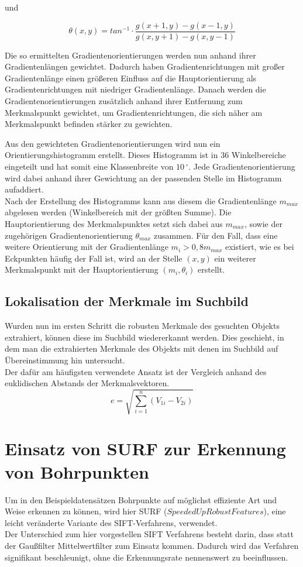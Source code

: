 und

\begin{equation*}
\theta (x, y) = tan^{-1}\cdot \frac{g(x +1, y) - g(x-1, y)}{g(x, y +1) - g(x, y-1)}
\end{equation*}

Die so ermittelten Gradientenorientierungen werden nun anhand ihrer Gradientenlängen gewichtet. Dadurch haben Gradientenrichtungen mit großer Gradientenlänge einen größeren Einfluss auf die Hauptorientierung als Gradientenrichtungen mit niedriger Gradientenlänge.
Danach werden die Gradientenorientierungen zusätzlich anhand ihrer Entfernung zum Merkmalspunkt gewichtet, um Gradientenrichtungen, die sich näher am Merkmalspunkt befinden stärker zu gewichten.

Aus den gewichteten Gradientenorientierungen wird nun ein Orientierungshistogramm erstellt. Dieses Histogramm ist in 36 Winkelbereiche eingeteilt und hat somit eine Klassenbreite von $10\,^{\circ}$.
Jede Gradientenorientierung wird dabei anhand ihrer Gewichtung an der passenden Stelle im Histogramm aufaddiert. \\
Nach der Erstellung des Histogramms kann aus diesem die Gradientenlänge $m_{max}$ abgelesen werden (Winkelbereich mit der größten Summe). Die Hauptorientierung des Merkmalspunktes  setzt sich dabei aus $m_{max}$, sowie der zugehörigen Gradientenorientierung $\theta_{max}$ zusammen.
Für den Fall, dass eine weitere Orientierung mit der Gradientenlänge $m_i > 0,8 m_{max}$
existiert, wie es bei Eckpunkten häufig der Fall ist, wird an der Stelle $(x, y)$ ein weiterer Merkmalspunkt mit der Hauptorientierung $(m_i, \theta_i)$ erstellt.
\subsection{Lokalisation der Merkmale im Suchbild}
Wurden nun im ersten Schritt die robusten Merkmale des gesuchten Objekts extrahiert, können diese im Suchbild wiedererkannt werden.
Dies geschieht, in dem man die extrahierten Merkmale des Objekts mit denen im Suchbild auf Übereinstimmung hin untersucht. \\
Der dafür am häufigsten verwendete Ansatz ist der Vergleich anhand des euklidischen Abstands der Merkmalsvektoren.
\begin{equation*}
e = \sqrt{\sum_{i = 1}^{n}(V_{1i} - V_{2i})}
\end{equation*}

\section{Einsatz von SURF zur Erkennung von Bohrpunkten}
Um in den Beispieldatensätzen Bohrpunkte auf möglichst effiziente Art und Weise erkennen zu können, wird hier SURF ($Speeded Up Robust Features$), eine leicht veränderte Variante des SIFT-Verfahrens, verwendet. \\
Der Unterschied zum hier vorgestellen SIFT Verfahrens besteht darin, dass statt der Gaußfilter Mittelwertfilter zum Einsatz kommen. Dadurch wird das Verfahren signifikant beschleunigt, ohne die Erkennungsrate nennenswert zu beeinflussen. \cite{Bay2005} \\

